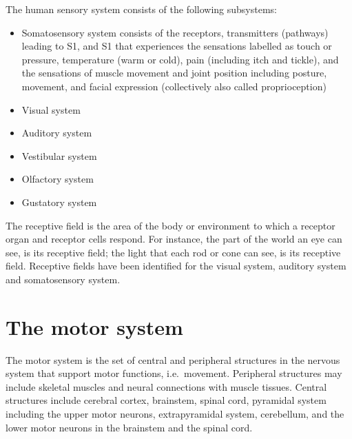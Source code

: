 The human sensory system consists of the following subsystems:

\begin{itemize}
\tightlist
\item
  Somatosensory system consists of the receptors, transmitters (pathways) leading to S1, and S1 that experiences the sensations labelled as touch or pressure, temperature (warm or cold), pain (including itch and tickle), and the sensations of muscle movement and joint position including posture, movement, and facial expression (collectively also called proprioception)
\item
  Visual system
\item
  Auditory system
\item
  Vestibular system
\item
  Olfactory system
\item
  Gustatory system
\end{itemize}

The receptive field is the area of the body or environment to which a receptor organ and receptor cells respond. For instance, the part of the world an eye can see, is its receptive field; the light that each rod or cone can see, is its receptive field. Receptive fields have been identified for the visual system, auditory system and somatosensory system.

\hypertarget{the-motor-system}{%
\section{The motor system}\label{the-motor-system}}

The motor system is the set of central and peripheral structures in the nervous system that support motor functions, i.e.~movement. Peripheral structures may include skeletal muscles and neural connections with muscle tissues. Central structures include cerebral cortex, brainstem, spinal cord, pyramidal system including the upper motor neurons, extrapyramidal system, cerebellum, and the lower motor neurons in the brainstem and the spinal cord.

